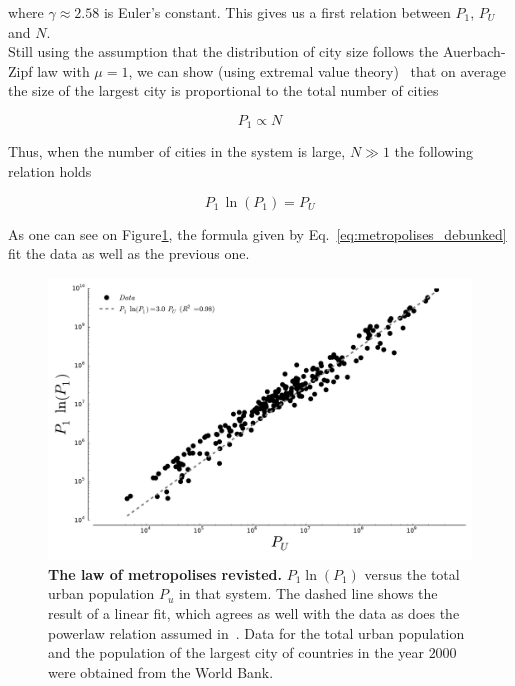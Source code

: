where $\gamma \approx 2.58$ is Euler's constant. This gives us a first relation
between $P_1$, $P_U$ and $N$.\\

Still using the assumption that the distribution of city size follows the
Auerbach-Zipf law with $\mu=1$, we can show (using extremal value
theory)~\cite{Clauset:2009} that on average the size of the largest city is proportional to the total
number of cities

\begin{equation*}
    P_1 \propto N
\end{equation*}

Thus, when the number of cities in the system is large, $N \gg 1$ the following
relation holds 

\begin{equation}
    \boxed{P_1\,\ln(P_1) = P_U}
    \label{eq:metropolises_debunked}
\end{equation}

As one can see on Figure\ref{fig:metropolises_debunked}, the formula given by
Eq.~\ref{eq:metropolises_debunked} fit the data as well as the previous one.

\begin{figure}[!h]
    \centering
    \includegraphics[width=\textwidth]{gfx/chapter-intro/law_metropolises_debunked.pdf}
    \caption{{\bf The law of metropolises revisted.} $P_1 \ln(P_1)$ versus the total urban population $P_u$ in that
system. The dashed line shows the result of a linear fit, which agrees as well
with the data as does the powerlaw relation assumed in~\cite{Pumain:1997}. Data for the total urban
population and the population of the largest city of countries in the year
$2000$ were obtained from
the World Bank.\label{fig:metropolises_debunked}}
\end{figure}



